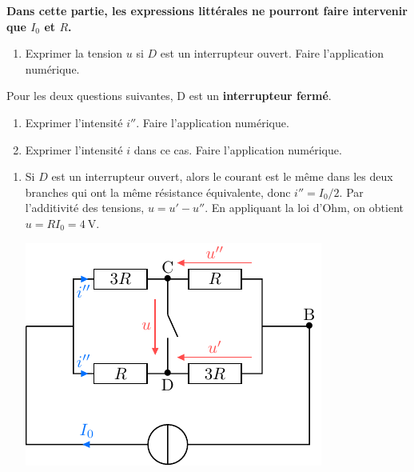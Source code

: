 \documentclass[a4paper, 10pt, garamond, oneside]{book}
\begin{document}
{	\begin{center}
		\bfseries
		Dans cette partie, les expressions littérales ne pourront faire intervenir
    que $I_0$ et $R$.
	\end{center}
	\begin{enumerate}[resume]
		\item Exprimer la tension $u$ si 	$D$ est un interrupteur ouvert.
		      Faire l'application numérique.
	\end{enumerate}
	Pour les deux questions suivantes, D est un \textbf{interrupteur fermé}.
	\begin{enumerate}[resume]
		\item Exprimer l'intensité $i''$. Faire l'application numérique.
		\item Exprimer l'intensité $i$ dans ce cas. Faire l'application numérique.
	\end{enumerate}
}{
	\begin{enumerate}[resume]
		\item \noindent
		      \begin{minipage}{0.4\linewidth}
			      Si $D$ est un interrupteur ouvert, alors le courant est le même
			      dans les deux branches qui ont la même résistance équivalente,
			      donc $i''=I_0/2$.
			      Par l'additivité des tensions, $u=u'-u''$.
			      En appliquant la loi d'Ohm, on obtient
			      $\boxed{u=RI_0=\SI{4}{\volt}}$.
		      \end{minipage}
		      \begin{minipage}{0.6\linewidth}
			      \begin{center}
		          \includegraphics[width=\linewidth]{diplin_q6}

\end{center}
\end{minipage}
\end{enumerate}}
\end{document}

